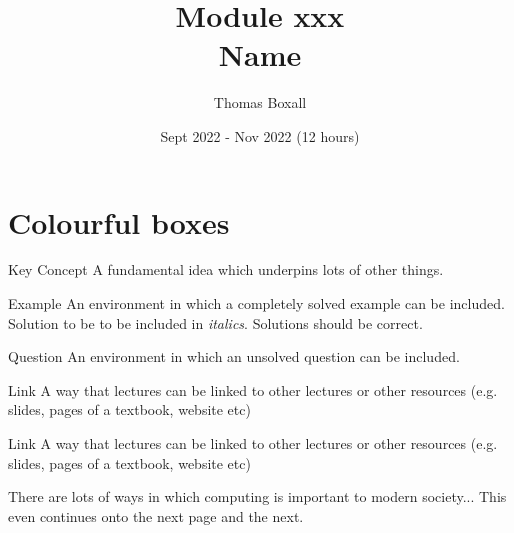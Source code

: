 \documentclass[a4paper, 11pt]{report}
\title{\textbf{Module xxx}\\Name}
\author{Thomas Boxall}
\date{Sept 2022 - Nov 2022 (12 hours)}
\begin{document}
\maketitle
\tableofcontents
\chapter*{Colourful boxes}
    

    \begin{keyconcept}{Key Concept}
    A fundamental idea which underpins lots of other things.
    \end{keyconcept}

    \begin{example}{Example}
        An environment in which a completely solved example can be included. Solution to be to be included in \textit{italics}. Solutions should be correct.
    \end{example}

    \begin{question}{Question}
        An environment in which an unsolved question can be included. 
    \end{question}

    \begin{link}{Link}
        A way that lectures can be linked to other lectures or other resources (e.g. slides, pages of a textbook, website etc)
    \end{link}

    

    \begin{link}{Link}
        A way that lectures can be linked to other lectures or other resources (e.g. slides, pages of a textbook, website etc)
    \end{link}
    There are lots of ways in which computing is important to modern society...
    \newpage
    This even continues onto the next page
    \newpage
    and the next.
\end{document}
